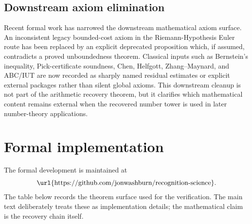 \documentclass[11pt,a4paper]{article}
\theoremstyle{definition}
\theoremstyle{remark}
\begin{document}
\subsection{Downstream axiom elimination}

Recent formal work has narrowed the downstream mathematical axiom surface.
An inconsistent legacy bounded-cost axiom in the Riemann-Hypothesis
Euler route has been replaced by an explicit deprecated proposition
which, if assumed, contradicts a proved unboundedness theorem. Classical
inputs such as Bernstein's inequality, Pick-certificate soundness, Chen,
Helfgott, Zhang--Maynard, and ABC/IUT are now recorded as sharply named
residual estimates or explicit external packages rather than silent
global axioms. This downstream cleanup is not part of the arithmetic
recovery theorem, but it clarifies which mathematical content remains
external when the recovered number tower is used in later number-theory
applications.

\appendix

\section{Formal implementation}
\label{app:formal}

The formal development is maintained at
\[
\text{\url{https://github.com/jonwashburn/recognition-science}}.
\]
The table below records the theorem surface used for the verification.
The main text deliberately treats these as implementation details; the
mathematical claim is the recovery chain itself.
\end{document}
